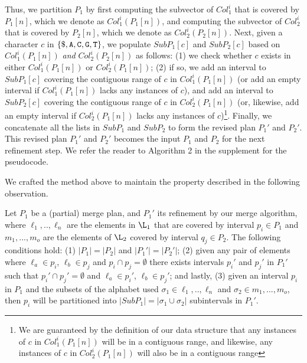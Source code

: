 Thus, we partition $P_1$ by first computing the subvector of $Col_1^i$ that is covered by $P_1[n]$, which we denote as $Col_1^i(P_1[n])$, and computing the subvector of $Col_2^i$ that is covered by $P_2[n]$, which we denote  as $Col_2^i(P_2[n])$.  Next, given a character $c$ in $\{ {\tt \$},  {\tt A}, {\tt C}, {\tt G}, {\tt T} \}$, we populate $SubP_1[c]$ and $SubP_2[c]$ based on $Col_1^i(P_1[n])$ {\em and} $Col_2^i(P_2[n])$ as follows: (1) we check whether $c$ exists in either $Col_1^i(P_1[n])$ or $Col_2^i(P_1[n])$; (2) if so, we add an interval to $SubP_1[c]$ covering the contiguous range of $c$ in  $Col_1^i(P_1[n])$ (or add an empty interval if $Col_1^i(P_1[n])$ lacks any instances of $c$), and add an interval to $SubP_2[c]$ covering the contiguous range of $c$ in  $Col_2^i(P_1[n])$ (or, likewise, add an empty interval if $Col_2^i(P_1[n])$ lacks any instances of $c$)\footnote{We are guaranteed by the definition of our data structure that any instances of $c$ in $Col_1^i(P_1[n])$ will be in a contiguous range, and likewise, any instances of $c$ in $Col_2^i(P_1[n])$ will also be in a contiguous range}.  Finally, we concatenate all the lists in $SubP_1$ and $SubP_2$ to form the revised plan $P_1'$ and $P_2'$. This revised plan $P_1'$ and $P_2'$ becomes the input $P_1$ and $P_2$ for the next refinement step. We refer the reader to Algorithm 2 in the supplement for the pseudocode. 
  
We crafted the method above to maintain the property described in the following observation.  %

 
\begin{observation} \label{obs} Let $P_1$ be a (partial) merge plan, and $P_1'$ its refinement by our merge algorithm, where $\ell_1,..,\ell_n$ are the elements in $\L_1$ that are covered by interval $p_{i} \in P_1$ and $m_1,...,m_o$ are the  elements of $\L_2$ covered by interval $q_{j} \in P_2$.  The following conditions hold:  (1) $|P_1| = |P_2|$ and $|P_1'| = |P_2'|$; (2) given any pair of
  elements where $\ell_a \in p_i$, $\ell_b \in p_j$ and $p_i \cap p_j = \emptyset$ there exists intervals $p_i'$ and $p_j'$ in $P_1'$ such that  $p_i' \cap p_j' = \emptyset$ and  $\ell_a \in p_i'$, $\ell_b \in p_j'$; and lastly, (3) given an interval $p_i$ in $P_1$ and the subsets of the alphabet used $\sigma_1 \in \ell_1,..,\ell_n$ and $\sigma_2 \in m_1,...,m_o$, then $p_i$ will be partitioned into $|SubP_1| = |\sigma_1\cup\sigma_2|$ subintervals in $P_1'$.
\end{observation} 

